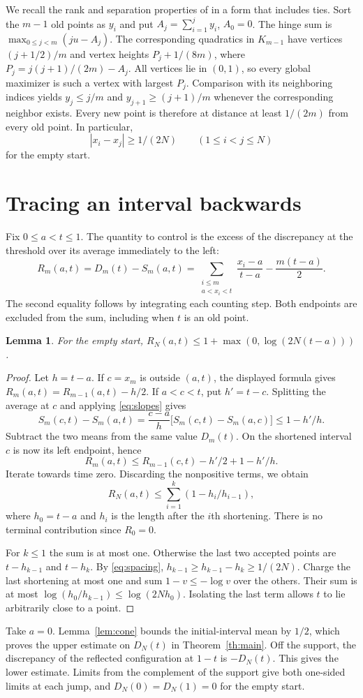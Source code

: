 \documentclass[11pt,a4paper]{amsart}
\newtheorem{lemma}[theorem]{Lemma}
\begin{document}
We recall the rank and separation properties of \cite[Theorems~2--3]{K}
in a form that includes ties. Sort the $m-1$ old points as $y_i$ and
put $A_j=\sum_{i=1}^j y_i$, $A_0=0$. The hinge sum is
$\max_{0\le j<m}(ju-A_j)$. The corresponding quadratics in $K_{m-1}$
have vertices $(j+1/2)/m$ and vertex heights
$P_j+1/(8m)$, where $P_j=j(j+1)/(2m)-A_j$.
All vertices lie in $(0,1)$, so every global maximizer is such a vertex
with largest $P_j$. Comparison with its neighboring indices yields
$y_j\le j/m$ and $y_{j+1}\ge(j+1)/m$ whenever the corresponding
neighbor exists. Every new point is therefore at distance at least
$1/(2m)$ from every old point. In particular,
\begin{equation}\label{eq:spacing}
 |x_i-x_j|\ge 1/(2N)\qquad(1\le i<j\le N)
\end{equation}
for the empty start.

\section{Tracing an interval backwards}\label{sec:trace}
Fix $0\le a<t\le1$. The quantity to control is the excess of the
discrepancy at the threshold over its average immediately to the left:
\[
 R_m(a,t)=D_m(t)-S_m(a,t)
   =\sum_{\substack{i\le m\\a<x_i<t}}\frac{x_i-a}{t-a}
       -\frac{m(t-a)}2 .
\]
The second equality follows by integrating each counting step. Both
endpoints are excluded from the sum, including when $t$ is an old point.

\begin{lemma}\label{lem:trace}
For the empty start,
$R_N(a,t)\le 1+\max(0,\log(2N(t-a)))$.
\end{lemma}
\begin{proof}
Let $h=t-a$. If $c=x_m$ is outside $(a,t)$, the displayed formula gives
$R_m(a,t)=R_{m-1}(a,t)-h/2$. If $a<c<t$, put $h'=t-c$. Splitting the
average at $c$ and applying \eqref{eq:slopes} gives
\[
 S_m(c,t)-S_m(a,t)=\frac{c-a}{h}\big[S_m(c,t)-S_m(a,c)\big]
 \le 1-h'/h .
\]
Subtract the two means from the same value $D_m(t)$. On the shortened
interval $c$ is now its left endpoint, hence
\[
 R_m(a,t)\le R_{m-1}(c,t)-h'/2+1-h'/h .
\]
Iterate towards time zero. Discarding the nonpositive terms, we obtain
\[
 R_N(a,t)\le \sum_{i=1}^k(1-h_i/h_{i-1}),
\]
where $h_0=t-a$ and $h_i$ is the length after the $i$th shortening.
There is no terminal contribution since $R_0=0$.

For $k\le1$ the sum is at most one. Otherwise the last two accepted
points are $t-h_{k-1}$ and $t-h_k$. By \eqref{eq:spacing},
$h_{k-1}\ge h_{k-1}-h_k\ge1/(2N)$. Charge the last shortening at
most one and sum $1-v\le-\log v$ over the others. Their sum is at most
$\log(h_0/h_{k-1})\le\log(2Nh_0)$. Isolating the last term allows
$t$ to lie arbitrarily close to a point.
\end{proof}
Take $a=0$. Lemma~\ref{lem:cone} bounds the initial-interval mean by
$1/2$, which proves the upper estimate on $D_N(t)$ in
Theorem~\ref{th:main}. Off the support, the discrepancy of the reflected
configuration at $1-t$ is $-D_N(t)$. This gives the lower estimate.
Limits from the complement of the support give both one-sided limits
at each jump, and $D_N(0)=D_N(1)=0$ for the empty start.
\end{document}
